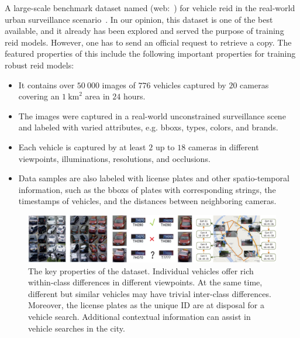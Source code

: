 A large-scale benchmark dataset named  (web:~\cite{veridataset}) for vehicle \gls{reid} in the real-world urban surveillance scenario~\cite{Liu2018}. In our opinion, this dataset is one of the best available, and it already has been explored and served the purpose of training \gls{reid} models. However, one has to send an official request to retrieve a copy. The featured properties of this include the following important properties for training robust \gls{reid} models:

\begin{itemize}
    \item It contains over $50\ 000$ images of $776$ vehicles captured by $20$ cameras covering an $1\  \text{km}^2$ area in $24$ hours.
    
    \item The images were captured in a real-world unconstrained surveillance scene and labeled with varied attributes, e.g. \glspl{bbox}, types, colors, and brands.
    
    \item Each vehicle is captured by at least $2$ up to $18$ cameras in different viewpoints, illuminations, resolutions, and occlusions.
    
    \item Data samples are also labeled with license plates and other spatio-temporal information, such as the \glspl{bbox} of plates with corresponding strings, the timestamps of vehicles, and the distances between neighboring cameras.
\end{itemize}

\begin{figure}[t]
    \centerline{\includegraphics[width=\linewidth]{figures/datasets/veri776__overview.pdf}}
    \caption[ dataset]{The key properties of the  dataset. Individual vehicles offer rich within-class differences in different viewpoints. At the same time, different but similar vehicles may have trivial inter-class differences. Moreover, the license plates as the unique ID are at disposal for a vehicle search. Additional contextual information can assist in vehicle searches in the city. }
    \label{fig:DatasetVeRI776}
\end{figure}
